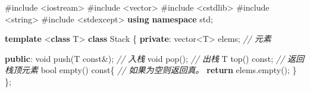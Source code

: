 \documentclass[
]{article}
\newenvironment{Shaded}{}{}
\newcommand{\AttributeTok}[1]{\textcolor[rgb]{0.49,0.56,0.16}{#1}}
\newcommand{\CommentTok}[1]{\textcolor[rgb]{0.38,0.63,0.69}{\textit{#1}}}
\newcommand{\ControlFlowTok}[1]{\textcolor[rgb]{0.00,0.44,0.13}{\textbf{#1}}}
\newcommand{\DataTypeTok}[1]{\textcolor[rgb]{0.56,0.13,0.00}{#1}}
\newcommand{\ImportTok}[1]{#1}
\newcommand{\KeywordTok}[1]{\textcolor[rgb]{0.00,0.44,0.13}{\textbf{#1}}}
\newcommand{\NormalTok}[1]{#1}
\newcommand{\OperatorTok}[1]{\textcolor[rgb]{0.40,0.40,0.40}{#1}}
\newcommand{\PreprocessorTok}[1]{\textcolor[rgb]{0.74,0.48,0.00}{#1}}
\begin{document}
\begin{Shaded}
\begin{Highlighting}[]
\PreprocessorTok{\#include }\ImportTok{\textless{}iostream\textgreater{}}
\PreprocessorTok{\#include }\ImportTok{\textless{}vector\textgreater{}}
\PreprocessorTok{\#include }\ImportTok{\textless{}cstdlib\textgreater{}}
\PreprocessorTok{\#include }\ImportTok{\textless{}string\textgreater{}}
\PreprocessorTok{\#include }\ImportTok{\textless{}stdexcept\textgreater{}}
\KeywordTok{using} \KeywordTok{namespace}\NormalTok{ std}\OperatorTok{;}

\KeywordTok{template} \OperatorTok{\textless{}}\KeywordTok{class}\NormalTok{ T}\OperatorTok{\textgreater{}}
\KeywordTok{class}\NormalTok{ Stack }\OperatorTok{\{} 
  \KeywordTok{private}\OperatorTok{:} 
\NormalTok{    vector}\OperatorTok{\textless{}}\NormalTok{T}\OperatorTok{\textgreater{}}\NormalTok{ elems}\OperatorTok{;}     \CommentTok{// 元素 }

  \KeywordTok{public}\OperatorTok{:} 
    \DataTypeTok{void}\NormalTok{ push}\OperatorTok{(}\NormalTok{T }\AttributeTok{const}\OperatorTok{\&);}  \CommentTok{// 入栈}
    \DataTypeTok{void}\NormalTok{ pop}\OperatorTok{();}               \CommentTok{// 出栈}
\NormalTok{    T top}\OperatorTok{()} \AttributeTok{const}\OperatorTok{;}            \CommentTok{// 返回栈顶元素}
    \DataTypeTok{bool}\NormalTok{ empty}\OperatorTok{()} \AttributeTok{const}\OperatorTok{\{}       \CommentTok{// 如果为空则返回真。}
        \ControlFlowTok{return}\NormalTok{ elems}\OperatorTok{.}\NormalTok{empty}\OperatorTok{();} 
    \OperatorTok{\}} 
\OperatorTok{\};} 
    

\end{Highlighting}
\end{Shaded}
\end{document}
